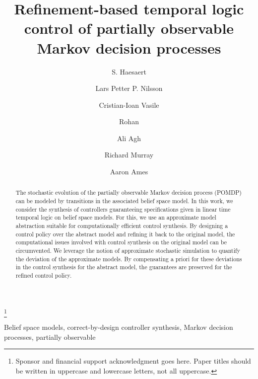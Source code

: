 \documentclass{ifacconf}
\begin{document}
\begin{frontmatter}

\title{\huge Refinement-based temporal logic control of partially observable Markov decision processes }
\thanks[footnoteinfo]{Sponsor and financial support acknowledgment
goes here. Paper titles should be written in uppercase and lowercase
letters, not all uppercase.}

\author[cal]{S. Haesaert} 
\author[cal]{Lars Petter P.  Nilsson} 
\author[mit]{ Cristian-Ioan Vasile}
\author[jpl]{Rohan}
\author[jpl]{ Ali Agh}
\author[cal]{Richard Murray}
\author[cal]{Aaron Ames}

\address[cal]{California Institute of Technology, 
   Pasadena, CA 91125 USA} %
\address[mit]{Massachusetts Institute of Technology, 
   Cambridge, MA 02139 USA}%
\address[jpl]{Jet Propulsion Laboratory, 
   Pasadena, CA 91109 USA}%
\maketitle
\begin{abstract}
The stochastic evolution of the partially observable Markov decision process (POMDP) can be modeled by transitions in the associated belief space model.
In this work, we consider the synthesis of controllers guaranteeing  specifications given in linear time temporal logic on belief space models.
For this, we use an approximate model abstraction%
 suitable for computationally efficient control synthesis. By designing a control policy over the abstract model and refining it back to the original model, the computational issues involved with control synthesis on the original model can be circumvented. 
We leverage the notion of approximate stochastic simulation to quantify the deviation of the approximate models.  %
By compensating a priori for these deviations in the control synthesis for the abstract model, the guarantees are preserved for the refined control policy.
\end{abstract}
\begin{keyword} Belief space models,
correct-by-design controller synthesis, Markov decision processes, partially observable
\end{keyword}

\end{frontmatter}
 
\end{document}
